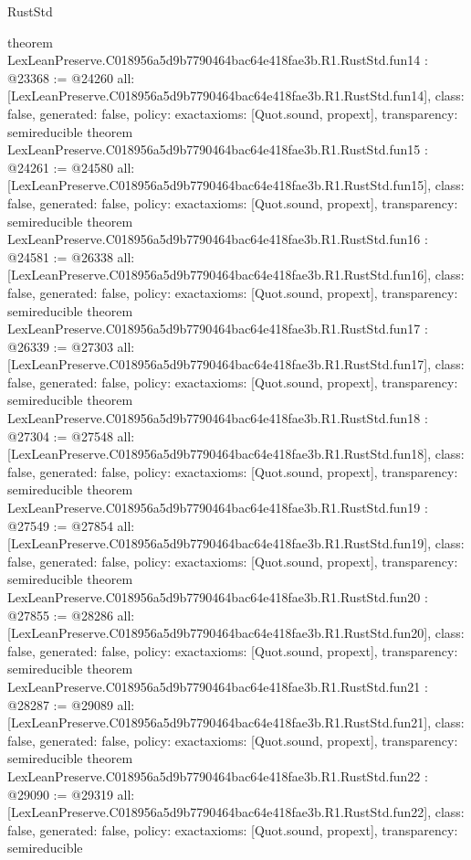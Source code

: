\begin{lexlean}{RustStd}
\begin{coremodule}
{}
theorem LexLeanPreserve.C018956a5d9b7790464bac64e418fae3b.R1.RustStd.fun14 : @23368 := @24260 {
  all: [LexLeanPreserve.C018956a5d9b7790464bac64e418fae3b.R1.RustStd.fun14],
  class: false,
  generated: false,
  policy: exact{axioms: [Quot.sound, propext]},
  transparency: semireducible
}
theorem LexLeanPreserve.C018956a5d9b7790464bac64e418fae3b.R1.RustStd.fun15 : @24261 := @24580 {
  all: [LexLeanPreserve.C018956a5d9b7790464bac64e418fae3b.R1.RustStd.fun15],
  class: false,
  generated: false,
  policy: exact{axioms: [Quot.sound, propext]},
  transparency: semireducible
}
theorem LexLeanPreserve.C018956a5d9b7790464bac64e418fae3b.R1.RustStd.fun16 : @24581 := @26338 {
  all: [LexLeanPreserve.C018956a5d9b7790464bac64e418fae3b.R1.RustStd.fun16],
  class: false,
  generated: false,
  policy: exact{axioms: [Quot.sound, propext]},
  transparency: semireducible
}
theorem LexLeanPreserve.C018956a5d9b7790464bac64e418fae3b.R1.RustStd.fun17 : @26339 := @27303 {
  all: [LexLeanPreserve.C018956a5d9b7790464bac64e418fae3b.R1.RustStd.fun17],
  class: false,
  generated: false,
  policy: exact{axioms: [Quot.sound, propext]},
  transparency: semireducible
}
theorem LexLeanPreserve.C018956a5d9b7790464bac64e418fae3b.R1.RustStd.fun18 : @27304 := @27548 {
  all: [LexLeanPreserve.C018956a5d9b7790464bac64e418fae3b.R1.RustStd.fun18],
  class: false,
  generated: false,
  policy: exact{axioms: [Quot.sound, propext]},
  transparency: semireducible
}
theorem LexLeanPreserve.C018956a5d9b7790464bac64e418fae3b.R1.RustStd.fun19 : @27549 := @27854 {
  all: [LexLeanPreserve.C018956a5d9b7790464bac64e418fae3b.R1.RustStd.fun19],
  class: false,
  generated: false,
  policy: exact{axioms: [Quot.sound, propext]},
  transparency: semireducible
}
theorem LexLeanPreserve.C018956a5d9b7790464bac64e418fae3b.R1.RustStd.fun20 : @27855 := @28286 {
  all: [LexLeanPreserve.C018956a5d9b7790464bac64e418fae3b.R1.RustStd.fun20],
  class: false,
  generated: false,
  policy: exact{axioms: [Quot.sound, propext]},
  transparency: semireducible
}
theorem LexLeanPreserve.C018956a5d9b7790464bac64e418fae3b.R1.RustStd.fun21 : @28287 := @29089 {
  all: [LexLeanPreserve.C018956a5d9b7790464bac64e418fae3b.R1.RustStd.fun21],
  class: false,
  generated: false,
  policy: exact{axioms: [Quot.sound, propext]},
  transparency: semireducible
}
theorem LexLeanPreserve.C018956a5d9b7790464bac64e418fae3b.R1.RustStd.fun22 : @29090 := @29319 {
  all: [LexLeanPreserve.C018956a5d9b7790464bac64e418fae3b.R1.RustStd.fun22],
  class: false,
  generated: false,
  policy: exact{axioms: [Quot.sound, propext]},
  transparency: semireducible
}
\end{coremodule}
\end{lexlean}

